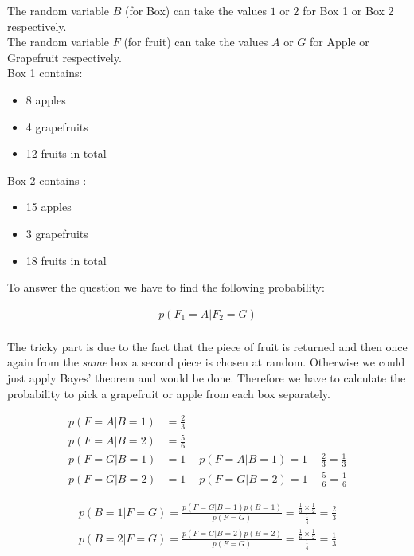 \documentclass[a4paper]{article}
\begin{document}
The random variable $B$ (for Box) can take the values $1$ or $2$ for Box 1 or Box 2 respectively.\\
The random variable $F$ (for fruit) can take the values $A$ or $G$ for Apple or Grapefruit respectively.\\ 

Box 1 contains:

\begin{itemize}
	\item 8 apples
	\item 4 grapefruits
	\item 12 fruits in total
\end{itemize}

Box 2 contains :

\begin{itemize}
	\item 15 apples
	\item 3 grapefruits
	\item 18 fruits in total
\end{itemize}

To answer the question we have to find the following probability:

\begin{align*}
	p(F_1 = A | F_2 = G)\\	
\end{align*}



The tricky part is due to the fact that the piece of fruit is returned and then once again from the \textit{same} box a second piece is chosen at random. Otherwise we could just apply Bayes' theorem and would be done. Therefore we have to calculate the probability to pick a grapefruit or apple from each box separately.

\begin{align*}
	p(F = A | B = 1) &= \frac{2}{3}\\
	p(F = A | B = 2) &= \frac{5}{6}\\
	p(F = G | B = 1) &= 1 - p(F = A | B = 1) = 1 - \frac{2}{3} = \frac{1}{3}\\
	p(F = G | B = 2) &= 1 - p(F = G | B = 2) = 1 - \frac{5}{6} = \frac{1}{6}
\end{align*}

\begin{align*}
	p(B = 1 | F = G) = \frac{p(F = G | B = 1)p(B = 1)}{p(F = G)} = \frac{\frac{1}{3} \times \frac{1}{2}}{\frac{1}{4}} = \frac{2}{3}\\
	p(B = 2 | F = G) = \frac{p(F = G | B = 2)p(B = 2)}{p(F = G)} = \frac{\frac{1}{6} \times \frac{1}{2}}{\frac{1}{4}} = \frac{1}{3}
\end{align*}
\end{document}
